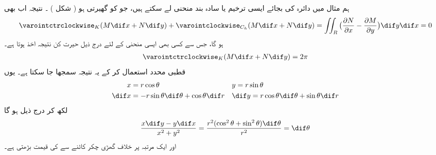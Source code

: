   ہم مثال    میں دائرہ  کی  بجائے     ایسی ترخیم  یا  سادہ بند منحنی    لے سکتے ہیں، جو   کو   گھیرتی ہو ( شکل    ) ۔ نتیجہ اب بھی 
\begin{align*}
\varointctrclockwise_K ( M \dif x + N \dif y ) + \varointclockwise_{C_h} ( M \dif x + N \dif y) = \iint_R \big(\frac{\partial N}{\partial x} - \frac{\partial M}{\partial y}\big) \dif y \dif x = 0 
\end{align*}
ہو گا،  جس سے کسی بھی  ایسی منحنی    کے لئے درج ذیل حیرت  کن نتیجہ اخذ ہوتا ہے۔ 
\begin{align*}
\varointctrclockwise_K ( M \dif x + N \dif y ) = 2 \pi 
\end{align*}
 قطبی محدد  استعمال کر کے یہ نتیجہ سمجھا جا سکتا ہے۔   یوں  
\begin{align*}
  x& = r\cos{\theta} && y = r\sin{\theta}\\   
 \dif x &= -r \sin{\theta} \dif \theta + \cos{\theta} \dif r  &&  \dif y = r \cos{\theta} \dif \theta + \sin{\theta} \dif r 
\end{align*}
 لکھ کر درج ذیل ہو گا
\begin{align}
  \frac{x \dif y - y\dif x}{x^2 + y^2} = \frac{r^2( \cos^2{\theta} + \sin^2{\theta}) \dif \theta}{r^2} = \dif \theta    
\end{align}
 اور ایک مرتبہ   پر خلاف گھڑی  چکر کاٹنے سے    کی قیمت   بڑھتی ہے۔
 
 
